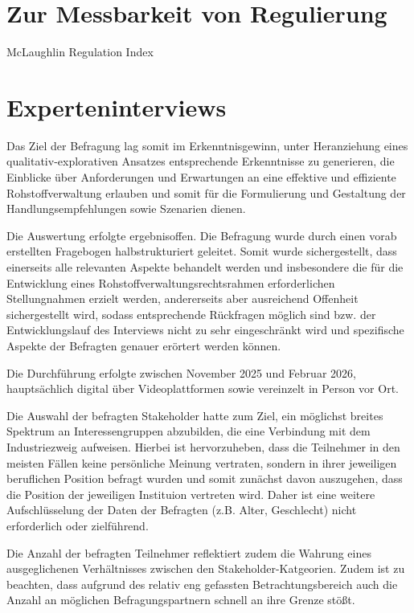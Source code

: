 \documentclass[12pt,a4paper,oneside]{book} %
\begin{document}
	
\section{Zur Messbarkeit von Regulierung}
McLaughlin Regulation Index



\section{Experteninterviews}

Das Ziel der Befragung lag somit im Erkenntnisgewinn, unter Heranziehung eines qualitativ-explorativen Ansatzes entsprechende Erkenntnisse zu generieren, die Einblicke über Anforderungen und Erwartungen an eine effektive und effiziente Rohstoffverwaltung erlauben und somit für die Formulierung und Gestaltung der Handlungsempfehlungen sowie Szenarien dienen.

Die Auswertung erfolgte ergebnisoffen. Die Befragung wurde durch einen vorab erstellten Fragebogen halbstrukturiert geleitet. Somit wurde sichergestellt, dass einerseits alle relevanten Aspekte behandelt werden und insbesondere die für die Entwicklung eines Rohstoffverwaltungsrechtsrahmen erforderlichen Stellungnahmen erzielt werden, andererseits aber ausreichend Offenheit sichergestellt wird, sodass entsprechende Rückfragen möglich sind bzw. der Entwicklungslauf des Interviews nicht zu sehr eingeschränkt wird und spezifische Aspekte der Befragten genauer erörtert werden können.

Die Durchführung erfolgte zwischen November 2025 und Februar 2026, hauptsächlich digital über Videoplattformen sowie vereinzelt in Person vor Ort.

Die Auswahl der befragten Stakeholder hatte zum Ziel, ein möglichst breites Spektrum an Interessengruppen abzubilden, die eine Verbindung mit dem Industriezweig aufweisen. Hierbei ist hervorzuheben, dass die Teilnehmer in den meisten Fällen keine persönliche Meinung vertraten, sondern in ihrer jeweiligen beruflichen Position befragt wurden und somit zunächst davon auszugehen, dass die Position der jeweiligen Instituion vertreten wird. Daher ist eine weitere Aufschlüsselung der Daten der Befragten (z.B. Alter, Geschlecht) nicht erforderlich oder zielführend.

Die Anzahl der befragten Teilnehmer reflektiert zudem die Wahrung eines ausgeglichenen Verhältnisses zwischen den Stakeholder-Katgeorien. Zudem ist zu beachten, dass aufgrund des relativ eng gefassten Betrachtungsbereich auch die Anzahl an möglichen Befragungspartnern schnell an ihre Grenze stößt.
\end{document}

